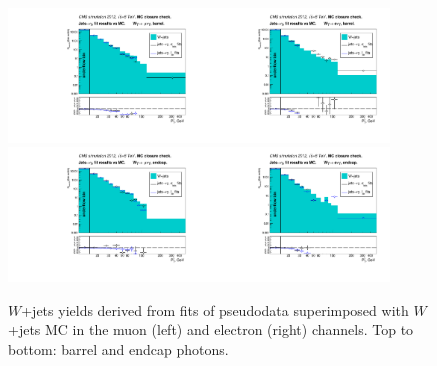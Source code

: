  \begin{figure}[htb]
  \begin{center}
   \includegraphics[width=0.45\textwidth]{../figs/figs_v11/MUON_WGamma/MCclosureWjetsPlusWg/c_FakeDDvsMC_c_MUON_WGamma__UNblind_MCclosure__Barrel__phoEt_MCclosure.pdf}\includegraphics[width=0.45\textwidth]{../figs/figs_v11/ELECTRON_WGamma/MCclosureWjetsPlusWg/c_FakeDDvsMC_c_ELECTRON_WGamma__UNblind_MCclosure__Barrel__phoEt_MCclosure.pdf}
   \includegraphics[width=0.45\textwidth]{../figs/figs_v11/MUON_WGamma/MCclosureWjetsPlusWg/c_FakeDDvsMC_c_MUON_WGamma__UNblind_MCclosure__Endcap__phoEt_MCclosure.pdf}\includegraphics[width=0.45\textwidth]{../figs/figs_v11/ELECTRON_WGamma/MCclosureWjetsPlusWg/c_FakeDDvsMC_c_ELECTRON_WGamma__UNblind_MCclosure__Endcap__phoEt_MCclosure.pdf}
  \caption{$W$+jets yields derived from fits of pseudodata superimposed with $W$+jets MC in the muon (left) and electron (right) channels. Top to bottom: barrel and endcap photons.}
  \label{fig:FakeDDvsMC_MCclosureWjetsPlusWg}
  \end{center}
\end{figure}

